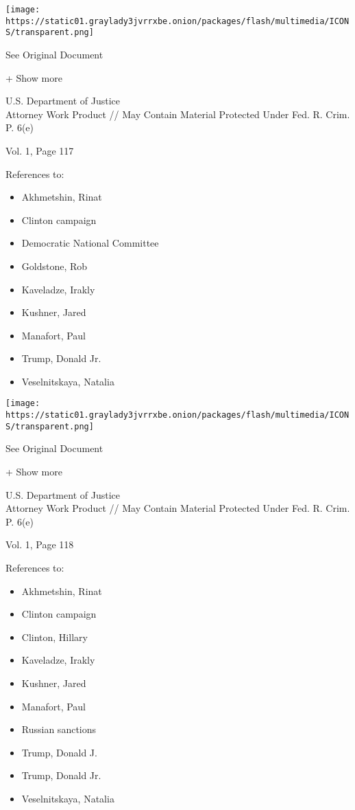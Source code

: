 \protect\hyperlink{}{}

\texttt{[image: https://static01.graylady3jvrrxbe.onion/packages/flash/multimedia/ICONS/transparent.png]}

See Original Document

+ Show more

U.S. Department of Justice\\
Attorney Work Product // May Contain Material Protected Under Fed. R.
Crim. P. 6(e)

Vol. 1, Page 117

References to:

\begin{itemize}
\tightlist
\item
  Akhmetshin, Rinat
\item
  Clinton campaign
\item
  Democratic National Committee
\item
  Goldstone, Rob
\item
  Kaveladze, Irakly
\item
  Kushner, Jared
\item
  Manafort, Paul 
\item
  Trump, Donald Jr.
\item
  Veselnitskaya, Natalia
\end{itemize}

\protect\hyperlink{}{}

\texttt{[image: https://static01.graylady3jvrrxbe.onion/packages/flash/multimedia/ICONS/transparent.png]}

See Original Document

+ Show more

U.S. Department of Justice\\
Attorney Work Product // May Contain Material Protected Under Fed. R.
Crim. P. 6(e)

Vol. 1, Page 118

References to:

\begin{itemize}
\tightlist
\item
  Akhmetshin, Rinat
\item
  Clinton campaign
\item
  Clinton, Hillary
\item
  Kaveladze, Irakly
\item
  Kushner, Jared
\item
  Manafort, Paul 
\item
  Russian sanctions
\item
  Trump, Donald J.
\item
  Trump, Donald Jr.
\item
  Veselnitskaya, Natalia
\end{itemize}

